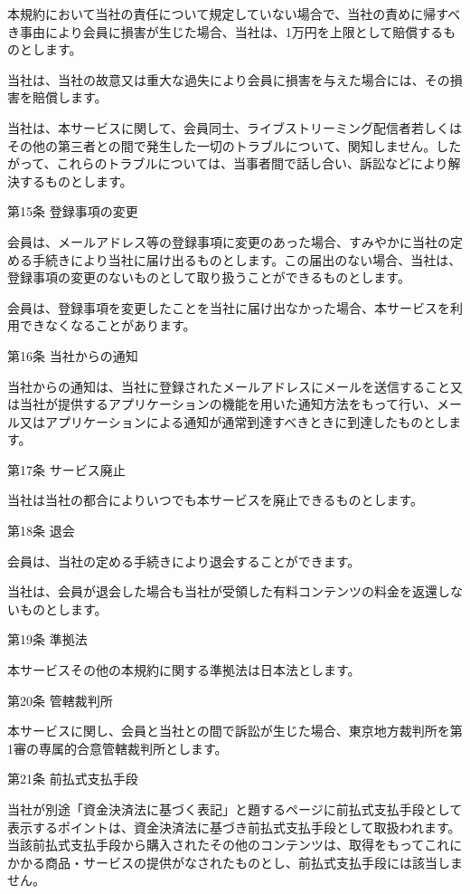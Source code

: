     本規約において当社の責任について規定していない場合で、当社の責めに帰すべき事由により会員に損害が生じた場合、当社は、1万円を上限として賠償するものとします。

    当社は、当社の故意又は重大な過失により会員に損害を与えた場合には、その損害を賠償します。

    当社は、本サービスに関して、会員同士、ライブストリーミング配信者若しくはその他の第三者との間で発生した一切のトラブルについて、関知しません。したがって、これらのトラブルについては、当事者間で話し合い、訴訟などにより解決するものとします。

第15条 登録事項の変更

    会員は、メールアドレス等の登録事項に変更のあった場合、すみやかに当社の定める手続きにより当社に届け出るものとします。この届出のない場合、当社は、登録事項の変更のないものとして取り扱うことができるものとします。

    会員は、登録事項を変更したことを当社に届け出なかった場合、本サービスを利用できなくなることがあります。

第16条 当社からの通知

    当社からの通知は、当社に登録されたメールアドレスにメールを送信すること又は当社が提供するアプリケーションの機能を用いた通知方法をもって行い、メール又はアプリケーションによる通知が通常到達すべきときに到達したものとします。

第17条 サービス廃止

    当社は当社の都合によりいつでも本サービスを廃止できるものとします。

第18条 退会

    会員は、当社の定める手続きにより退会することができます。

    当社は、会員が退会した場合も当社が受領した有料コンテンツの料金を返還しないものとします。

第19条 準拠法

    本サービスその他の本規約に関する準拠法は日本法とします。

第20条 管轄裁判所

    本サービスに関し、会員と当社との間で訴訟が生じた場合、東京地方裁判所を第1審の専属的合意管轄裁判所とします。

第21条 前払式支払手段

    当社が別途「資金決済法に基づく表記」と題するページに前払式支払手段として表示するポイントは、資金決済法に基づき前払式支払手段として取扱われます。当該前払式支払手段から購入されたその他のコンテンツは、取得をもってこれにかかる商品・サービスの提供がなされたものとし、前払式支払手段には該当しません。

